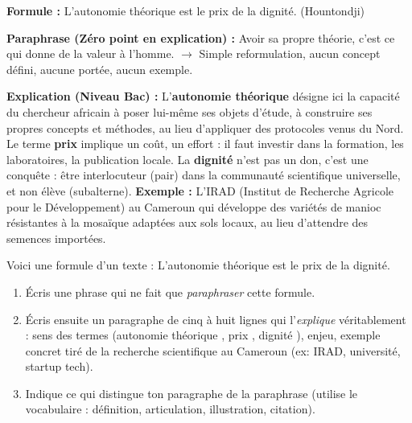\documentclass[11pt]{article}
\begin{document}
\begin{exemplebox}
\textbf{Formule :} \og L'autonomie théorique est le prix de la dignité. \fg (Hountondji)

\textbf{Paraphrase (Zéro point en explication) :} \og Avoir sa propre théorie, c'est ce qui donne de la valeur à l'homme. \fg $\rightarrow$ Simple reformulation, aucun concept défini, aucune portée, aucun exemple.

\textbf{Explication (Niveau Bac) :}
\og L'\textbf{autonomie théorique} désigne ici la capacité du chercheur africain à poser lui-même ses objets d'étude, à construire ses propres concepts et méthodes, au lieu d'appliquer des protocoles venus du Nord. Le terme \textbf{prix} implique un coût, un effort : il faut investir dans la formation, les laboratoires, la publication locale. La \textbf{dignité} n'est pas un don, c'est une conquête : être \og interlocuteur \fg (pair) dans la communauté scientifique universelle, et non \og élève \fg (subalterne). \textbf{Exemple :} L'IRAD (Institut de Recherche Agricole pour le Développement) au Cameroun qui développe des variétés de manioc résistantes à la mosaïque adaptées aux sols locaux, au lieu d'attendre des semences importées. \fg
\end{exemplebox}

\begin{exercice}
Voici une formule d'un texte : \og L'autonomie théorique est le prix de la dignité. \fg
\begin{enumerate}
\item Écris une phrase qui ne fait que \emph{paraphraser} cette formule.
\item Écris ensuite un paragraphe de cinq à huit lignes qui l'\emph{explique} véritablement : sens des termes (\og autonomie théorique \fg, \og prix \fg, \og dignité \fg), enjeu, exemple concret tiré de la recherche scientifique au Cameroun (ex: IRAD, université, startup tech).
\item Indique ce qui distingue ton paragraphe de la paraphrase (utilise le vocabulaire : définition, articulation, illustration, citation).
\end{enumerate}
\end{exercice}
\end{document}
